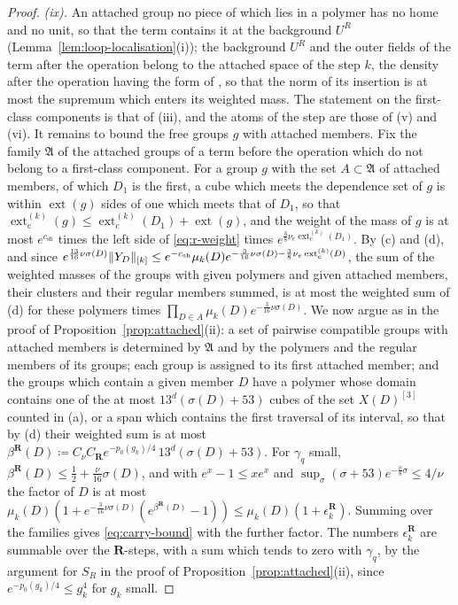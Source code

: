 \documentclass[11pt]{preprint}
\DeclarePairedDelimiter{\norm}{\lVert}{\rVert}
\numberwithin{equation}{section}
\theoremstyle{definition}
\theoremstyle{remark}
\theoremstyle{plain}
\begin{document}
\begin{proof}
\emph{(ix).} An attached group no piece of which lies in a polymer has no home and no unit, so that the term contains it at the background $U^R$ (Lemma~\ref{lem:loop-localisation}(i)); the background $U^R$ and the outer fields of the term after the operation belong to the attached space of the step $k$, the density after the operation having the form of \cite[Sect.~2]{BalabanCRE} \cite[Theorem~1, p.~355]{BalabanLFR2}, so that the norm of its insertion is at most the supremum which enters its weighted mass. The statement on the first-class components is that of (iii), and the atoms of the step are those of (v) and (vi). It remains to bound the free groups $g$ with attached members. Fix the family $\mathfrak A$ of the attached groups of a term before the operation which do not belong to a first-class component. For a group $g$ with the set $A \subset \mathfrak A$ of attached members, of which $D_1$ is the first, a cube which meets the dependence set of $g$ is within $\operatorname{ext}(g)$ sides of one which meets that of $D_1$, so that $\operatorname{ext}^{(k)}_{\mathrm c}(g) \leq \operatorname{ext}^{(k)}_{\mathrm c}(D_1) + \operatorname{ext}(g)$, and the weight of the mass of $g$ is at most $e^{c_{\mathrm{sh}}}$ times the left side of \eqref{eq:r-weight} times $e^{\frac38\nu_e\operatorname{ext}^{(k)}_{\mathrm c}(D_1)}$. By (c) and (d), and since $e^{\frac{13}{16}\nu\sigma(D)}\norm{Y_D}_{[k]} \leq e^{-c_{\mathrm{sh}}}\mu_k(D)e^{-\frac{3}{16}\nu\sigma(D) - \frac38\nu_e\operatorname{ext}^{(k)}_{\mathrm c}(D)}$, the sum of the weighted masses of the groups with given polymers and given attached members, their clusters and their regular members summed, is at most the weighted sum of (d) for these polymers times $\prod_{D \in A}\mu_k(D)e^{-\frac{3}{16}\nu\sigma(D)}$. We now argue as in the proof of Proposition~\ref{prop:attached}(ii): a set of pairwise compatible groups with attached members is determined by $\mathfrak A$ and by the polymers and the regular members of its groups; each group is assigned to its first attached member; and the groups which contain a given member $D$ have a polymer whose domain contains one of the at most $13^d(\sigma(D) + 53)$ cubes of the set $X(D)^{[3]}$ counted in (a), or a span which contains the first traversal of its interval, so that by (d) their weighted sum is at most $\beta^{\mathbf R}(D) \coloneqq C_\nu C_{\mathbf R}e^{-p_0(g_k)/4}\,13^d(\sigma(D) + 53)$. For $\gamma_q$ small, $\beta^{\mathbf R}(D) \leq \frac12 + \frac{\nu}{16}\sigma(D)$, and with $e^x - 1 \leq xe^x$ and $\sup_\sigma(\sigma + 53)e^{-\frac{\nu}{8}\sigma} \leq 4/\nu$ the factor of $D$ is at most $\mu_k(D)(1 + e^{-\frac{3}{16}\nu\sigma(D)}(e^{\beta^{\mathbf R}(D)} - 1)) \leq \mu_k(D)(1 + \epsilon^{\mathbf R}_k)$. Summing over the families gives \eqref{eq:carry-bound} with the further factor. The numbers $\epsilon^{\mathbf R}_k$ are summable over the $\mathbf R$-steps, with a sum which tends to zero with $\gamma_q$, by the argument for $S_R$ in the proof of Proposition~\ref{prop:attached}(ii), since $e^{-p_0(g_k)/4} \leq g_k^4$ for $g_k$ small.


\end{proof}
\end{document}
